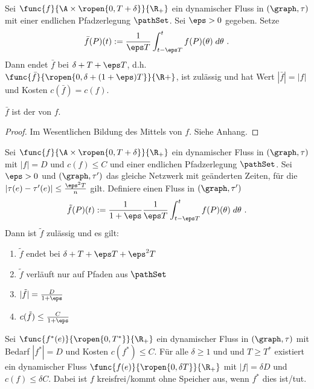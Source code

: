 \begin{lemma}\label{lem:flow_avg}
    Sei $\func{f}{\A \times \ropen{0, T + \delta}}{\R_+}$ ein dynamischer Fluss in
    $(\graph, \tau)$ mit einer endlichen Pfadzerlegung $\pathSet$.
    Sei $\eps > 0$ gegeben. Setze
    \[
    \bar{f}(P)(t) := \frac{1}{\eps T}
                            \int_{t - \eps T}^{t} f(P)(\theta) \; d\theta \text{ .}
    \]
    Dann endet $\bar{f}$ bei $\delta + T + \eps T$,
    d.h. $\func{\bar{f}}{\ropen{0, \delta + (1+\eps)T}}{\R+}$, ist zulässig und hat Wert
    $|\bar{f}| = |f|$ und Kosten $c(\bar{f}) = c(f)$.

    $\bar{f}$ ist der  von $f$.

    \begin{proof}
        Im Wesentlichen Bildung des Mittels von $f$. Siehe Anhang.
    \end{proof}
\end{lemma}

\begin{theorem}\label{theo:slow_flow}
    Sei $\func{f}{\A \times \ropen{0, T + \delta}}{\R_+}$ ein dynamischer Fluss in
    $(\graph, \tau)$ mit $|f| = D$ und $c(f) \leq C$ und einer endlichen
    Pfadzerlegung $\pathSet$. Sei $\eps > 0$ und $(\graph, \tau')$ das
    gleiche Netzwerk mit geänderten Zeiten, für die
    $\left|\tau(e) - \tau'(e)\right| \leq \frac{\eps^2T}{n}$ gilt. Definiere
    einen Fluss in $(\graph, \tau')$
    \[
    \tilde{f}(P)(t) := \frac{1}{1+\eps} \frac{1}{\eps T}
                            \int_{t - \eps T}^{t} f(P)(\theta) \; d\theta \text{ .}
    \]
    Dann ist $\tilde{f}$ zulässig und es gilt:
    \begin{enumerate}
        \item $\tilde{f}$ endet bei $\delta + T + \eps T + \eps^2 T$
        \item $\tilde{f}$ verläuft nur auf Pfaden aus $\pathSet$
        \item $|\tilde{f}| = \frac{D}{1 + \eps}$
        \item $c(\tilde{f}) \leq \frac{C}{1 + \eps}$
    \end{enumerate}
\end{theorem}

\begin{lemma}\label{lem:relaxed_flow}
    Sei $\func{f^*(e)}{\ropen{0,T^*}}{\R_+}$ ein dynamischer Fluss in $(\graph, \tau)$
    mit Bedarf $|f^*| = D$ und Kosten $c(f^*) \leq C$. Für alle $\delta \geq 1$ und
    und $T \geq T^*$ existiert ein dynamischer Fluss
    $\func{f(e)}{\ropen{0, \delta T}}{\R_+}$ mit $|f| = \delta D$ und
    $c(f) \leq \delta C$. Dabei ist $f$ kreisfrei/kommt ohne Speicher aus, wenn $f^*$
    dies ist/tut.
\end{lemma}

